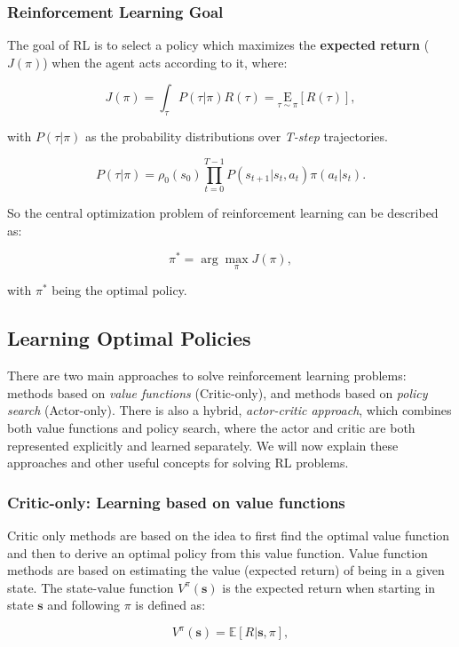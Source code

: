 \subsubsection{Reinforcement Learning Goal}

The goal of RL is to select a policy which maximizes the \textbf{expected return} ($ J(\pi) $) when the agent acts according to it, where:
\begin{center}
	\begin{equation} \label{eq:expected_return}
		J(\pi)=\int_{\tau} P(\tau | \pi) R(\tau)=\underset{\tau \sim \pi}{\mathrm{E}}[R(\tau)],
	\end{equation}
\end{center}

with $ P(\tau | \pi) $ as the probability distributions over \textit{T-step} trajectories.
\begin{center}
	\begin{equation}
		P(\tau | \pi)=\rho_{0}\left(s_{0}\right) \prod_{t=0}^{T-1} P\left(s_{t+1} | s_{t}, a_{t}\right) \pi\left(a_{t} | s_{t}\right).
	\end{equation}
\end{center}

So the central optimization problem of reinforcement learning can be described as:
\begin{center}
	\begin{equation}
		\pi^{*}=\arg \max _{\pi} J(\pi),
	\end{equation}
\end{center}
with $\pi^*$ being the optimal policy.


\subsection{Learning Optimal Policies}

There are two main approaches to solve reinforcement learning problems: methods based on \textit{value functions} (Critic-only), and methods based on \textit{policy search} (Actor-only). There is also a hybrid, \textit{actor-critic approach}, which combines both value functions and policy search, where the actor and critic are both represented explicitly and learned separately. We will now explain these approaches and other useful concepts for solving RL problems.

\subsubsection{Critic-only: Learning based on value functions}
Critic only methods are based on the idea to first find the optimal value function and then to derive an optimal policy from this value function.  Value function methods are based on estimating the value (expected return) of being in a given state. The state-value function $V^{\pi}(\mathbf{s})$ is the expected return when starting in state $\mathbf{s}$ and following $\pi$ is defined as:
\begin{center}
	        \begin{equation}
	                V^{\pi}(\mathbf{s})=\mathbb{E}[R | \mathbf{s}, \pi],
	        \end{equation}
\end{center}

